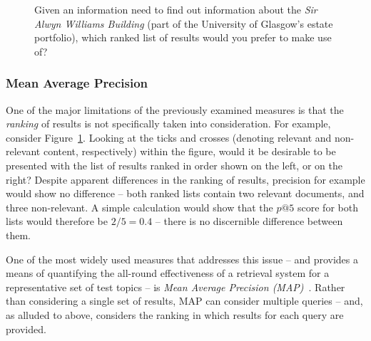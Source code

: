 \begin{figure}[t!]
    \centering
    \caption[The importance of ranking]{Given an information need to find out information about the \emph{Sir Alwyn Williams Building} (part of the University of Glasgow's estate portfolio), which ranked list of results would you prefer to make use of?}
    \label{fig:ranking}
\end{figure}

\subsubsection{Mean Average Precision}
One of the major limitations of the previously examined measures is that the \emph{ranking} of results is not specifically taken into consideration. For example, consider Figure~\ref{fig:ranking}. Looking at the {\color{dmax_green}ticks} and {\color{dmax_red}crosses} (denoting relevant and non-relevant content, respectively) within the figure, would it be desirable to be presented with the list of results ranked in order shown on the left, or on the right? Despite apparent differences in the ranking of results, precision for example would show no difference -- both ranked lists contain two relevant documents, and three non-relevant. A simple calculation would show that the $p@5$ score for both lists would therefore be $2 / 5 = 0.4$ -- there is no discernible difference between them.

One of the most widely used measures that addresses this issue -- and provides a means of quantifying the all-round effectiveness of a retrieval system for a representative set of test topics -- is \emph{Mean Average Precision (MAP)}~\cite{voorhees2005trec_book}. Rather than considering a single set of results, MAP can consider multiple queries -- and, as alluded to above, considers the ranking in which results for each query are provided.

